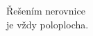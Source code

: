 \documentclass[preview]{standalone}
\begin{document}
\begin{center}
Řešením nerovnice\\ je vždy poloplocha.
\end{center}
\end{document}
